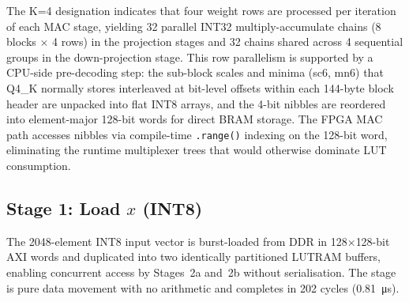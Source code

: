 \documentclass[manuscript,]{acmart} %
\begin{document}
The K=4 designation indicates that four weight rows are processed per iteration of
each MAC stage, yielding 32 parallel INT32 multiply-accumulate chains (8 blocks
$\times$ 4 rows) in the projection stages and 32 chains shared across 4 sequential
groups in the down-projection stage.
This row parallelism is supported by a CPU-side pre-decoding step: the sub-block
scales and minima (sc6, mn6) that Q4\_K normally stores interleaved at bit-level
offsets within each 144-byte block header are unpacked into flat INT8 arrays, and
the 4-bit nibbles are reordered into element-major 128-bit words for direct BRAM
storage.
The FPGA MAC path accesses nibbles via compile-time \texttt{.range()} indexing on
the 128-bit word, eliminating the runtime multiplexer trees that would otherwise
dominate LUT consumption.

\subsection*{Stage 1: Load $x$ (INT8)}

The 2048-element INT8 input vector is burst-loaded from DDR in 128$\times$128-bit AXI
words and duplicated into two identically partitioned LUTRAM buffers, enabling
concurrent access by Stages~2a and~2b without serialisation.
The stage is pure data movement with no arithmetic and completes in 202 cycles (\SI{0.81}{\micro\second}).

\end{document}
